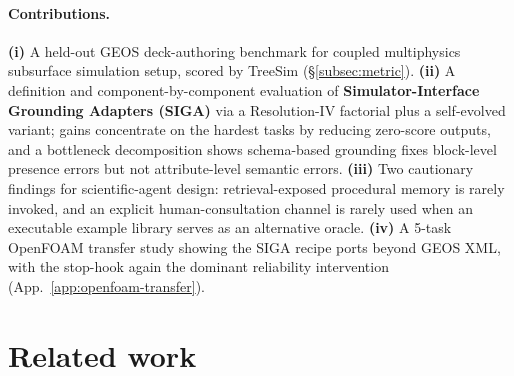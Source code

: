 \documentclass{article}
\begin{document}
\noindent\paragraph{Contributions.}
\textbf{(i)} A held-out GEOS deck-authoring benchmark for coupled multiphysics subsurface simulation setup, scored by TreeSim (\S\ref{subsec:metric}).
\textbf{(ii)} A definition and component-by-component evaluation of \textbf{Simulator-Interface Grounding Adapters (SIGA)} via a Resolution-IV factorial plus a self-evolved variant; gains concentrate on the hardest tasks by reducing zero-score outputs, and a bottleneck decomposition shows schema-based grounding fixes block-level presence errors but not attribute-level semantic errors.
\textbf{(iii)} Two cautionary findings for scientific-agent design: retrieval-exposed procedural memory is rarely invoked, and an explicit human-consultation channel is rarely used when an executable example library serves as an alternative oracle.
\textbf{(iv)} A 5-task OpenFOAM transfer study showing the SIGA recipe ports beyond GEOS XML, with the stop-hook again the dominant reliability intervention (App.~\ref{app:openfoam-transfer}).

\section{Related work}
\label{sec:related}
\end{document}
